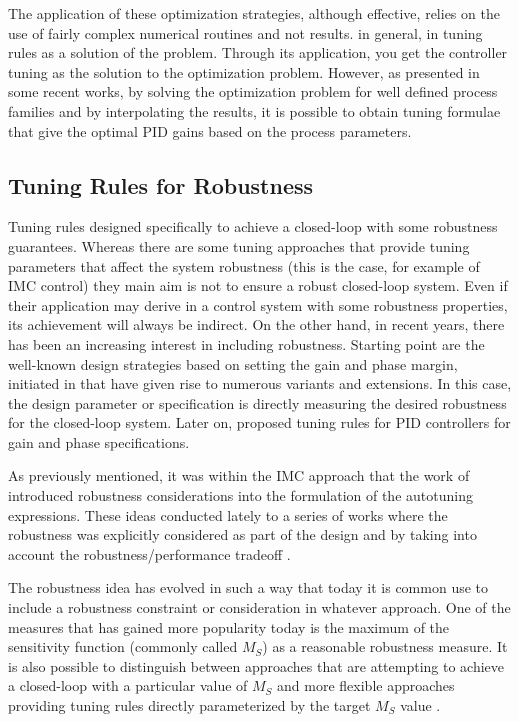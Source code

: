 The application of these optimization strategies, although effective, relies on the use of fairly complex numerical routines and not results. in general, in tuning rules as a solution of the problem. Through its application, you get the controller tuning as the solution to the optimization problem. However, as presented in some recent works, by solving the optimization problem for well defined process families and by interpolating the results, it is possible to obtain tuning formulae that give the optimal PID gains based on the process parameters. 


\subsection{Tuning Rules for Robustness}

Tuning rules designed specifically to achieve a closed-loop with some robustness guarantees. Whereas there are some tuning approaches that provide tuning parameters that  affect the system robustness (this is the case, for example of IMC control) they main aim is not to ensure a robust closed-loop system. Even if their application may derive in a control system with some robustness properties, its achievement will always be indirect. On the other hand, in recent years, there has been an increasing interest in including robustness. Starting point are the well-known design strategies based on setting the gain and phase margin, initiated in \citet{astromhagglun84} that have given rise to numerous variants and extensions. In this case, the design parameter or specification is directly measuring the desired robustness for the closed-loop system. Later on, \citet{hoetal95} proposed tuning rules for PID controllers for gain and phase specifications.

As previously mentioned, it was within the IMC approach that the work of \citet{vilanovaJPC2008} introduced robustness considerations into the formulation of the autotuning  expressions. These ideas conducted lately to a series of works \citep{alcantara2010, alcantara2013} where the robustness was explicitly considered as part of the design and by taking into account the robustness/performance tradeoff \citep{alfaroajoc12}.

The robustness idea has evolved in such a way that today it is common use to include a robustness constraint or consideration in whatever approach. One of the measures that has gained more popularity today is the maximum of the sensitivity function (commonly called $M_S$) as a reasonable robustness measure. It is also possible to distinguish between approaches that are attempting to achieve a closed-loop with a particular value of $M_S$ and more flexible approaches providing tuning rules directly parameterized by the target $M_S$ value \citep{arrieta2012, VilanovaBook2012}. 

